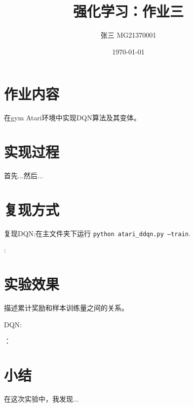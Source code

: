 \documentclass[a4paper,12pt]{article}
\begin{document}
\begin{CJK}{UTF8}{gbsn}

\title{强化学习：作业三}

\author{张三 MG21370001}

\date{\today}

\maketitle

\section{作业内容}
在gym Atari环境中实现DQN算法及其变体。

\section{实现过程}

首先...然后...

\section{复现方式}
复现DQN:在主文件夹下运行 \texttt{python atari\_ddqn.py --train}.

:
\section{实验效果}
描述累计奖励和样本训练量之间的关系。

\noindent DQN:

：

\section{小结}
在这次实验中，我发现...



\end{CJK}
\end{document}
